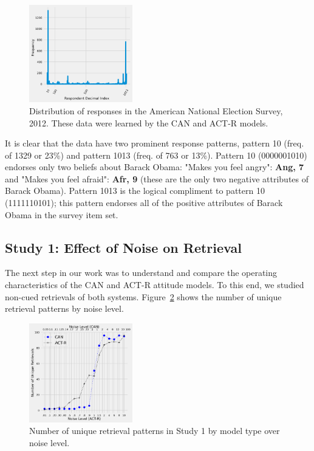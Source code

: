 \documentclass[10pt,letterpaper]{article}
\begin{document}
\begin{figure}[H]
\begin{center}
\includegraphics[width=0.4\textwidth,height=0.3\textwidth]{Fig_Gibbs_RealData.png}
\end{center}
\caption{Distribution of responses in the American National Election Survey, 2012. These data were learned by the CAN and ACT-R models.} 
\label{RealDataGibbs-figure}
\end{figure}

It is clear that the data have two prominent response patterns, pattern 10 (freq. of 1329 or 23\%) and pattern 1013 (freq. of 763 or 13\%).  Pattern 10 (0000001010) endorses only two beliefs about Barack Obama: "Makes you feel angry": \textbf{Ang, 7} and "Makes you feel afraid": \textbf{Afr, 9} (these are the only two negative attributes of Barack Obama). Pattern 1013 is the logical compliment to pattern 10 (1111110101); this pattern endorses all of the positive attributes of Barack Obama in the survey item set. 

\subsection{Study 1: Effect of Noise on Retrieval}
The next step in our work was to understand and compare the operating characteristics of the CAN and ACT-R attitude models.   To this end, we studied non-cued retrievals of both systems. Figure~\ref{numbendstates-figure} shows the number of unique retrieval patterns by noise level.  

\begin{figure}[H]
\begin{center}
\includegraphics[width=0.4\textwidth]{Num_Endstates_CAN-IBL.png}
\end{center}
\caption{Number of unique retrieval patterns in Study 1 by model type over noise level.} 
\label{numbendstates-figure}
\end{figure}
\end{document}
